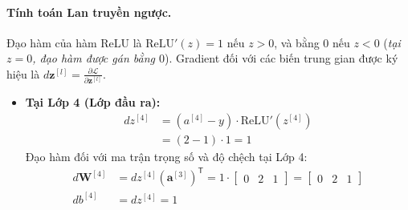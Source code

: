 \paragraph{Tính toán Lan truyền ngược.\\}
Đạo hàm của hàm ReLU là $\text{ReLU}'(z) = 1$ nếu $z > 0$, và bằng $0$ nếu $z < 0$ (\textit{tại $z = 0$, đạo hàm được gán bằng $0$}). Gradient đối với các biến trung gian được ký hiệu là $d\mathbf{z}^{[l]} = \frac{\partial \mathcal{L}}{\partial \mathbf{z}^{[l]}}$.
\begin{itemize}
    \item \textbf{Tại Lớp 4 (Lớp đầu ra):}
    \begin{align*}
    dz^{[4]} &= (a^{[4]} - y) \cdot \text{ReLU}'(z^{[4]}) \\
    &= (2 - 1) \cdot 1 = 1
    \end{align*}
    Đạo hàm đối với ma trận trọng số và độ chệch tại Lớp 4:
    \begin{align*}
    d\mathbf{W}^{[4]} &= dz^{[4]} \left(\mathbf{a}^{[3]}\right)^{\mathsf{T}} = 1 \cdot \begin{bmatrix} 0 & 2 & 1 \end{bmatrix} = \begin{bmatrix} 0 & 2 & 1 \end{bmatrix} \\
    db^{[4]} &= dz^{[4]} = 1
    \end{align*}


\end{itemize}

